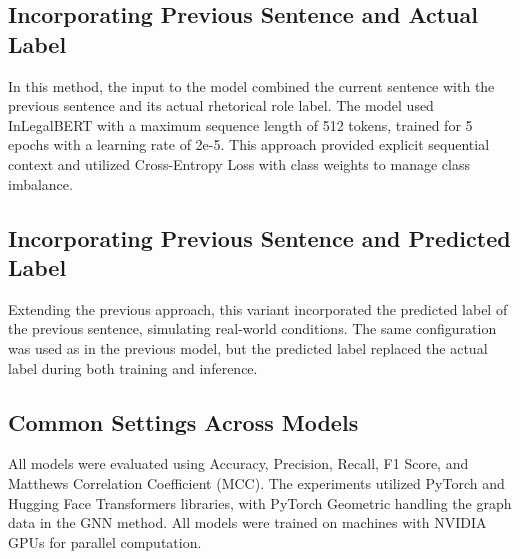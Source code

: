 \subsection{Incorporating Previous Sentence and Actual Label}
In this method, the input to the model combined the current sentence with the previous sentence and its actual rhetorical role label. The model used InLegalBERT with a maximum sequence length of 512 tokens, trained for 5 epochs with a learning rate of 2e-5. This approach provided explicit sequential context and utilized Cross-Entropy Loss with class weights to manage class imbalance.

\subsection{Incorporating Previous Sentence and Predicted Label}
Extending the previous approach, this variant incorporated the predicted label of the previous sentence, simulating real-world conditions. The same configuration was used as in the previous model, but the predicted label replaced the actual label during both training and inference.

\subsection{Common Settings Across Models}
All models were evaluated using Accuracy, Precision, Recall, F1 Score, and Matthews Correlation Coefficient (MCC). The experiments utilized PyTorch and Hugging Face Transformers libraries, with PyTorch Geometric handling the graph data in the GNN method. All models were trained on machines with NVIDIA GPUs for parallel computation.

